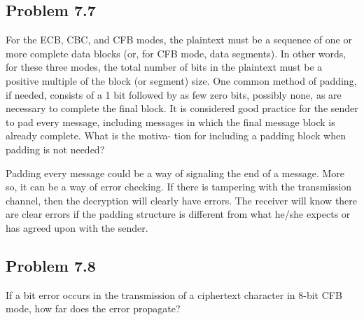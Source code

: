 \documentclass[../hw_sols.tex]{subfiles}
\begin{document}
\newpage



\subsection*{Problem 7.7}

For the ECB, CBC, and CFB modes, the plaintext must be a sequence of one or 
more complete data blocks (or, for CFB mode, data segments). In other words, 
for these three modes, the total number of bits in the plaintext must be a 
positive multiple of the block (or segment) size. One common method of 
padding, if needed, consists of a 1 bit followed by as few zero bits, possibly 
none, as are necessary to complete the final block. It is considered good 
practice for the sender to pad every message, including messages in which the 
final message block is already complete. What is the motiva- tion for 
including a padding block when padding is not needed?

\begin{solution}
Padding every message could be a way of signaling the end of a message. More 
so, it can be a way of error checking. If there is tampering with the 
transmission channel, then the decryption will clearly have errors. The 
receiver will know there are clear errors if the padding structure is 
different from what he/she expects or has agreed upon with the sender.
\end{solution}


\newpage



\subsection*{Problem 7.8}

If a bit error occurs in the transmission of a ciphertext character in 8-bit 
CFB mode, how far does the error propagate?
\end{document}
